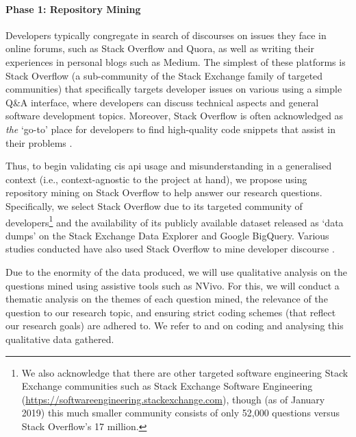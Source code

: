 \paragraph{Phase 1: Repository Mining}
Developers typically congregate in search of discourses on issues they face in online forums, such as Stack Overflow and Quora, as well as writing their experiences in personal blogs such as Medium. The simplest of these platforms is Stack Overflow (a sub-community of the Stack Exchange family of targeted communities) that specifically targets developer issues on various using a simple Q\&A interface, where developers can discuss technical aspects and general software development topics. Moreover, Stack Overflow is often acknowledged as \textit{the} `go-to' place for developers to find high-quality code snippets that assist in their problems \citep{Subramanian:2014bg}.

Thus, to begin validating \gls{cis} \gls{api} usage and misunderstanding in a generalised context (i.e., context-agnostic to the project at hand), we propose using repository mining on Stack Overflow to help answer our research questions. Specifically, we select Stack Overflow due to its targeted community of developers\footnote{We also acknowledge that there are other targeted software engineering Stack Exchange communities such as Stack Exchange Software Engineering (\url{https://softwareengineering.stackexchange.com}), though (as of January 2019) this much smaller community consists of only 52,000 questions versus Stack Overflow's 17 million.} and the availability of its publicly available dataset released as `data dumps' on the Stack Exchange Data Explorer and Google BigQuery. Various studies conducted have also used Stack Overflow to mine developer discourse \citep{Choi:2015wo,Sinha:2013tt,Novielli:2015vd,Rosen:2016uk,Pal:2012te,Bajaj:2014wg,LinaresVasquez:2014vj,Wang:2013ue,Barua:2014vo,Reboucas:2016tw,Allamanis:2013vb,Tahir:2018ks}.

Due to the enormity of the data produced, we will use qualitative analysis on the questions mined using assistive tools such as NVivo. For this, we will conduct a thematic analysis on the themes of each question mined, the relevance of the question to our research topic, and ensuring strict coding schemes (that reflect our research goals) are adhered to. We refer to \citet{Singer:2007tu} and \citet{Miles:1994ty} on coding and analysing this qualitative data gathered.

